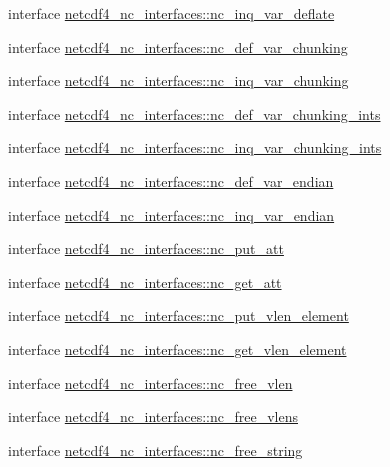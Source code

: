 \begin{DoxyCompactItemize}
\item 
interface \hyperlink{interfacenetcdf4__nc__interfaces_1_1nc__inq__var__deflate}{netcdf4\+\_\+nc\+\_\+interfaces\+::nc\+\_\+inq\+\_\+var\+\_\+deflate}
\item 
interface \hyperlink{interfacenetcdf4__nc__interfaces_1_1nc__def__var__chunking}{netcdf4\+\_\+nc\+\_\+interfaces\+::nc\+\_\+def\+\_\+var\+\_\+chunking}
\item 
interface \hyperlink{interfacenetcdf4__nc__interfaces_1_1nc__inq__var__chunking}{netcdf4\+\_\+nc\+\_\+interfaces\+::nc\+\_\+inq\+\_\+var\+\_\+chunking}
\item 
interface \hyperlink{interfacenetcdf4__nc__interfaces_1_1nc__def__var__chunking__ints}{netcdf4\+\_\+nc\+\_\+interfaces\+::nc\+\_\+def\+\_\+var\+\_\+chunking\+\_\+ints}
\item 
interface \hyperlink{interfacenetcdf4__nc__interfaces_1_1nc__inq__var__chunking__ints}{netcdf4\+\_\+nc\+\_\+interfaces\+::nc\+\_\+inq\+\_\+var\+\_\+chunking\+\_\+ints}
\item 
interface \hyperlink{interfacenetcdf4__nc__interfaces_1_1nc__def__var__endian}{netcdf4\+\_\+nc\+\_\+interfaces\+::nc\+\_\+def\+\_\+var\+\_\+endian}
\item 
interface \hyperlink{interfacenetcdf4__nc__interfaces_1_1nc__inq__var__endian}{netcdf4\+\_\+nc\+\_\+interfaces\+::nc\+\_\+inq\+\_\+var\+\_\+endian}
\item 
interface \hyperlink{interfacenetcdf4__nc__interfaces_1_1nc__put__att}{netcdf4\+\_\+nc\+\_\+interfaces\+::nc\+\_\+put\+\_\+att}
\item 
interface \hyperlink{interfacenetcdf4__nc__interfaces_1_1nc__get__att}{netcdf4\+\_\+nc\+\_\+interfaces\+::nc\+\_\+get\+\_\+att}
\item 
interface \hyperlink{interfacenetcdf4__nc__interfaces_1_1nc__put__vlen__element}{netcdf4\+\_\+nc\+\_\+interfaces\+::nc\+\_\+put\+\_\+vlen\+\_\+element}
\item 
interface \hyperlink{interfacenetcdf4__nc__interfaces_1_1nc__get__vlen__element}{netcdf4\+\_\+nc\+\_\+interfaces\+::nc\+\_\+get\+\_\+vlen\+\_\+element}
\item 
interface \hyperlink{interfacenetcdf4__nc__interfaces_1_1nc__free__vlen}{netcdf4\+\_\+nc\+\_\+interfaces\+::nc\+\_\+free\+\_\+vlen}
\item 
interface \hyperlink{interfacenetcdf4__nc__interfaces_1_1nc__free__vlens}{netcdf4\+\_\+nc\+\_\+interfaces\+::nc\+\_\+free\+\_\+vlens}
\item 
interface \hyperlink{interfacenetcdf4__nc__interfaces_1_1nc__free__string}{netcdf4\+\_\+nc\+\_\+interfaces\+::nc\+\_\+free\+\_\+string}

\end{DoxyCompactItemize}
